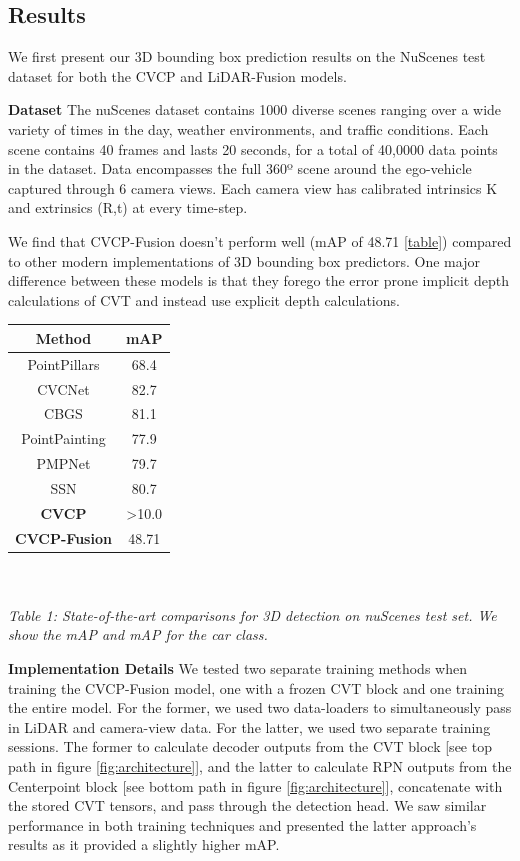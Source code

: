\documentclass[a4paper,12pt]{article}
\begin{document}
\begin{multicols}{2}

\section{Results}
We first present our 3D bounding box prediction results on the NuScenes test dataset for both the CVCP and LiDAR-Fusion models.

\textbf{Dataset} The nuScenes\cite{nuscenes} dataset contains 1000 diverse scenes ranging over a wide variety of times in the day, weather environments, and traffic conditions. Each scene contains 40 frames and lasts 20 seconds, for a total of 40,0000 data points in the dataset. Data encompasses the full 360º scene around the ego-vehicle captured through 6 camera views. Each camera view has calibrated intrinsics K and extrinsics (R,t) at every time-step.

We find that CVCP-Fusion doesn't perform well (mAP of 48.71 \ref{table}) compared to other modern implementations of 3D bounding box predictors. One major difference between these models is that they forego the error prone implicit depth calculations of CVT and instead use explicit depth calculations.

\bgroup
\def\arraystretch{1.5}
\begin{center}
\begin{tabular}{| c|c |} 
\hline
\large{Method} & \large{mAP} \\ 
\hline
PointPillars \cite{PointPillars} & 68.4\\ 
CVCNet \cite{CVCNet} & 82.7 \\ 
CBGS \cite{CBGS} & 81.1 \\ 
PointPainting \cite{PointPainting} & 77.9 \\ 
PMPNet \cite{PMPNet} & 79.7 \\ 
SSN \cite{SSN} & 80.7 \\ 
\hline
\textbf{CVCP} & >10.0 \\ 
\textbf{CVCP-Fusion} & 48.71 \\ 
\hline
\end{tabular}
\label{table}
\\
\textit{\\Table 1: State-of-the-art comparisons for 3D detection on nuScenes test set. We show the mAP and mAP for the car class.}
\end{center}
\egroup

\textbf{Implementation Details}
We tested two separate training methods when training the CVCP-Fusion model, one with a frozen CVT block and one training the entire model. For the former, we used two data-loaders to simultaneously pass in LiDAR and camera-view data. For the latter, we used two separate training sessions. The former to calculate decoder outputs from the CVT block [see top path in figure \ref{fig:architecture}], and the latter to calculate RPN outputs from the Centerpoint block [see bottom path in figure \ref{fig:architecture}], concatenate with the stored CVT tensors, and pass through the detection head. We saw similar performance in both training techniques and presented the latter approach's results as it provided a slightly higher mAP. 


\end{multicols}
\end{document}
